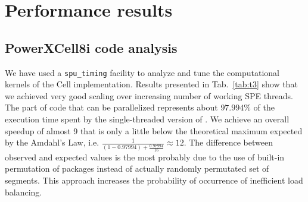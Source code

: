\section{Performance results}
\subsection{PowerXCell8i code analysis}
We have used a \texttt{spu\_timing} facility to analyze and tune the computational
kernels of the \prog{} Cell implementation.
Results presented in Tab.~\ref{tab:t3} show that we achieved
very good scaling over increasing number of working SPE threads.
The part of code that can be parallelized represents about $97.994\%$ of the execution
time spent by the single-threaded version of \prog{}.
We achieve an overall speedup of almost 9 that is only a little below the theoretical maximum expected by the Amdahl's Law, i.e. $\frac{1}{(1-0.97994) + \frac{0.97994}{16}}\approx12$.
The difference between observed and expected values is the most probably due to the use of built-in permutation of packages instead of actually randomly permutated set of segments. 
This approach increases the probability of occurrence of inefficient load balancing.
